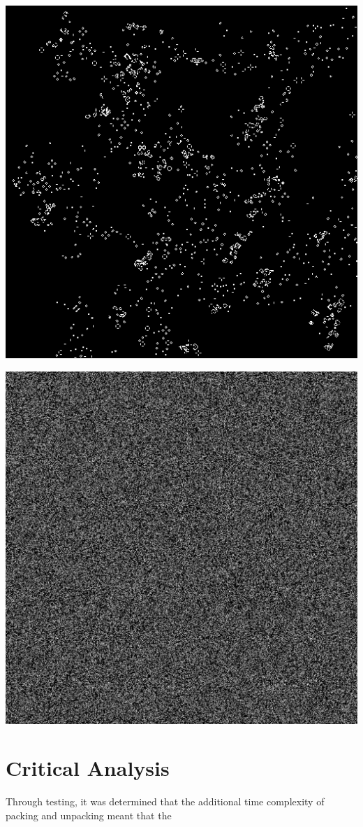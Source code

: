 \documentclass[11pt, oneside]{article}
\newenvironment{Figure}
  {\par\medskip\noindent\minipage{\linewidth}}
  {\endminipage\par\medskip}
\begin{document}
\begin{multicols}{3}
\begin{Figure}
\includegraphics[width=\linewidth]{images/512x512_2.png}
\end{Figure}

\begin{Figure}
\includegraphics[width=\linewidth]{images/1472x1472.png}
\end{Figure}

\end{multicols}



\pagebreak
\section{Critical Analysis}
Through testing, it was determined that the additional time complexity of packing and unpacking meant that the





\end{document}
